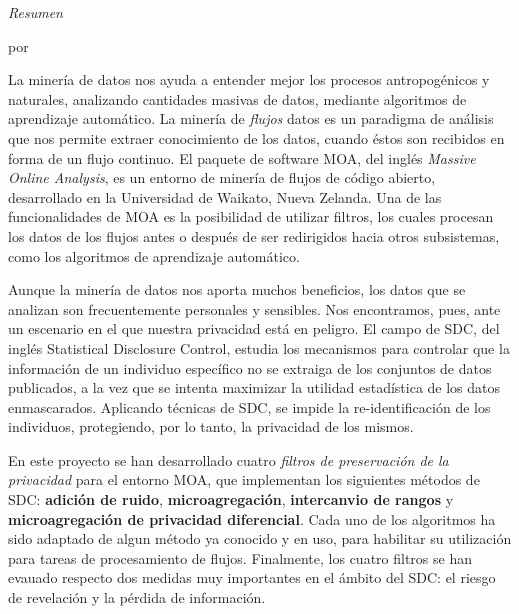 \clearpage %

\thispagestyle{plain}
\null\vfil
\begin{center}
	\setlength{\parskip}{0pt}
	{\huge{\textit{Resumen}} \par}
	\bigskip
	{\Large\bf \ttitle \par} %
	\medskip
	{\normalsize por \authornames \par} %
\end{center}

La minería de datos nos ayuda a entender mejor los procesos antropogénicos y naturales, analizando cantidades masivas de datos, mediante algoritmos de aprendizaje automático. La minería de \textit{flujos} datos es un paradigma de análisis que nos permite extraer conocimiento de los datos, cuando éstos son recibidos en forma de un flujo continuo. El paquete de software MOA, del inglés \textit{Massive Online Analysis}, es un entorno de minería de flujos de código abierto, desarrollado en la Universidad de Waikato, Nueva Zelanda. Una de las funcionalidades de MOA es la posibilidad de utilizar filtros, los cuales procesan los datos de los flujos antes o después de ser redirigidos hacia otros subsistemas, como los algoritmos de aprendizaje automático.

Aunque la minería de datos nos aporta muchos beneficios, los datos que se analizan son frecuentemente personales y sensibles. Nos encontramos, pues, ante un escenario en el que nuestra privacidad está en peligro. El campo de SDC, del inglés {Statistical Disclosure Control}, estudia los mecanismos para controlar que la información de un individuo específico no se extraiga de los conjuntos de datos publicados, a la vez que se intenta maximizar la utilidad estadística de los datos enmascarados. Aplicando técnicas de SDC, se impide la re-identificación de los individuos, protegiendo, por lo tanto, la privacidad de los mismos.

En este proyecto se han desarrollado cuatro \textit{filtros de preservación de la privacidad} para el entorno MOA, que implementan los siguientes métodos de SDC: \textbf{adición de ruido}, \textbf{microagregación}, \textbf{intercanvio de rangos} y \textbf{microagregación de privacidad diferencial}. Cada uno de los algoritmos ha sido adaptado de algun método ya conocido y en uso, para habilitar su utilización para tareas de procesamiento de flujos. Finalmente, los cuatro filtros se han evauado respecto dos medidas muy importantes en el ámbito del SDC: el riesgo de revelación y la pérdida de información.

\clearpage %